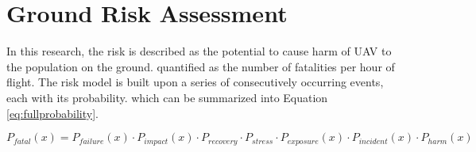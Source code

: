 \documentclass[12pt]{report}
\begin{document}
    \section{Ground Risk Assessment}
        In this research, the risk is described as the potential to cause harm of UAV to the population on the ground.
        quantified as the number of fatalities per hour of flight. The risk model is built upon a series of
        consecutively occurring events, each with its probability. which can be summarized into Equation
        \ref{eq:fullprobability}.
        
        \begin{equation}\label{eq:fullprobability}
            P_{fatal}(x) = P_{failure}(x) \cdot P_{impact}(x) \cdot P_{recovery} \cdot P_{stress} \cdot P_{exposure}(x) \cdot P_{incident}(x) \cdot P_{harm}(x)
        \end{equation}
\end{document}
